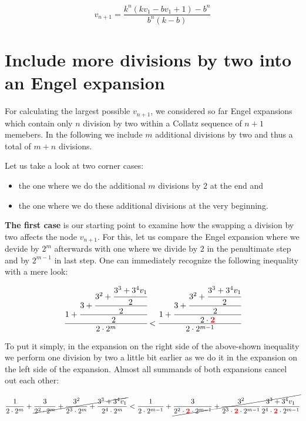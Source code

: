 \documentclass[12pt]{amsart}
\theoremstyle{definition}
\begin{document}
\begin{equation}
\label{eq:generalized_asc_continued_fraction}
v_{n+1}=\frac{k^n(kv_1-bv_1+1)-b^n}{b^n(k-b)}
\end{equation}

\newpage
\section{Include more divisions by two into an Engel expansion}
\label{sec:include_divisions_engel_expansion}
For calculating the largest possible $v_{n+1}$, we considered so far Engel expansions which contain only $n$ division by two within a Collatz sequence of $n+1$ memebers. In the following we include $m$ additional divisions by two and thus a total of $m+n$ divisions.

\par\bigskip
Let us take a look at two corner cases:
\begin{itemize}
	\item the one where we do the additional $m$ divisions by $2$ at the end and
	\item the one where we do these additional divisions at the very beginning.
\end{itemize}

\par\bigskip\noindent
\textbf{The first case} is our starting point to examine how the swapping a division by two affects the node $v_{n+1}$. For this, let us compare the Engel expansion where we devide by $2^m$ afterwards with one where we divide by $2$ in the penultimate step and by $2^{m-1}$ in last step. One can immediately recognize the following inequality with a mere look:

\[
\cfrac{1+\cfrac{3+\cfrac{3^2+\cfrac{3^3+3^4v_1}{2}}{2}}{2}}{2\cdot2^m}
<
\cfrac{1+\cfrac{3+\cfrac{3^2+\cfrac{3^3+3^4v_1}{2}}{2}}{2\cdot\textcolor{red}{\mathbf{2}}}}{2\cdot2^{m-1}}
\]

\par\bigskip
To put it simply, in the expansion on the right side of the above-shown inequality we perform one division by two a little bit earlier as we do it in the expansion on the left side of the expansion. Almost all summands of both expansions cancel out each other:

\[
\frac{1}{2\cdot2^m}+\cancel{\frac{3}{2^2\cdot2^m}+\frac{3^2}{2^3\cdot2^m}+\frac{3^3+3^4v_1}{2^4\cdot2^m}}
<
\frac{1}{2\cdot2^{m-1}}+\cancel{\frac{3}{2^2\cdot\textcolor{red}{\mathbf{2}}\cdot2^{m-1}}+\frac{3^2}{2^3\cdot\textcolor{red}{\mathbf{2}}\cdot2^{m-1}}\frac{3^3+3^4v_1}{2^4\cdot\textcolor{red}{\mathbf{2}}\cdot2^{m-1}}}
\]
\end{document}
